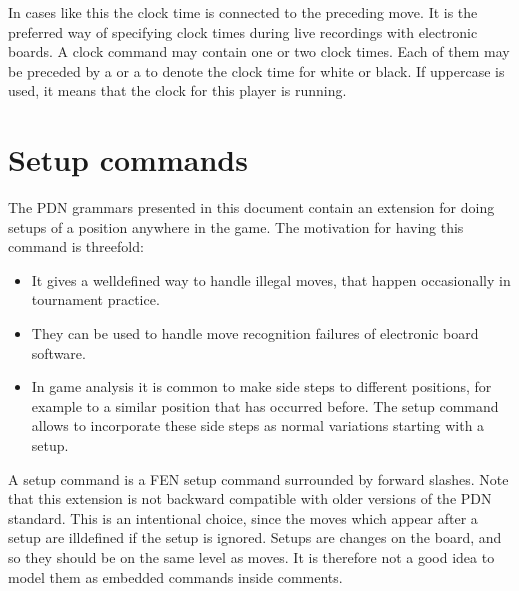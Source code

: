 \documentclass[letterpaper,10pt,english]{sphinxmanual}
\begin{document}
\sphinxAtStartPar
In cases like this the clock time is connected to the preceding move. It is
the preferred way of specifying clock times during live recordings with
electronic boards. A clock command may contain one or two clock times. Each
of them may be preceded by a  or a  to denote the clock time for
white or black. If uppercase is used, it means that the clock for this player
is running.


\section{Setup commands}
\label{\detokenize{commands:setup-commands}}
\sphinxAtStartPar
The PDN grammars presented in this document contain an extension for doing
setups of a position anywhere in the game. The motivation for having this
command is threefold:
\begin{itemize}
\item {} 
\sphinxAtStartPar
It gives a well\sphinxhyphen{}defined way to handle illegal moves, that happen occasionally
in tournament practice.

\item {} 
\sphinxAtStartPar
They can be used to handle move recognition failures of electronic board
software.

\item {} 
\sphinxAtStartPar
In game analysis it is common to make side steps to different positions,
for example to a similar position that has occurred before. The setup
command allows to incorporate these side steps as normal variations
starting with a setup.

\end{itemize}

\sphinxAtStartPar
A setup command is a FEN setup command surrounded by forward slashes.
Note that this extension is not backward compatible with older versions
of the PDN standard. This is an intentional choice, since the moves which
appear after a setup are ill\sphinxhyphen{}defined if the setup is ignored. Setups are changes
on the board, and so they should be on the same level as moves. It is therefore
not a good idea to model them as embedded commands inside comments.

\sphinxAtStartPar
{}

\begin{sphinxVerbatim}[commandchars=\\\{\}]
   
           
\end{sphinxVerbatim}
\end{document}
